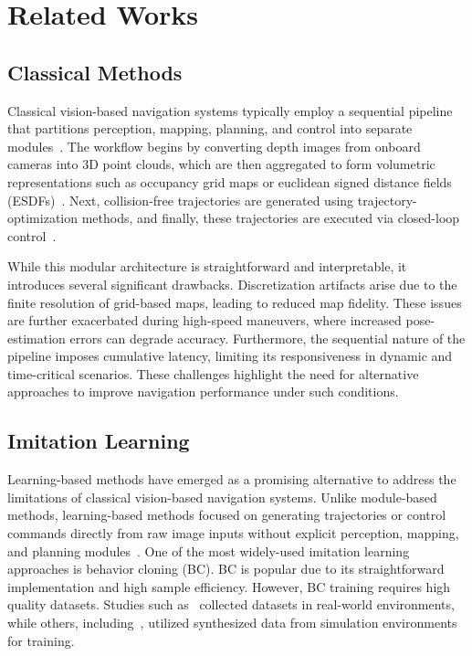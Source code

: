 \section{Related Works}
\label{Related Works}
\subsection{Classical Methods}
Classical vision-based navigation systems typically employ a sequential pipeline that partitions perception, mapping, planning, and control into separate modules~\cite{tordesillas2021faster, zhou2021raptor}. The workflow begins by converting depth images from onboard cameras into 3D point clouds, which are then aggregated to form volumetric representations such as occupancy grid maps or euclidean signed distance fields (ESDFs)~\cite{zhou2021raptor}. Next, collision-free trajectories are generated using trajectory-optimization methods, and finally, these trajectories are executed via closed-loop control~\cite{lee2010geometric, Falanga2018}. 

While this modular architecture is straightforward and interpretable, it introduces several significant drawbacks. Discretization artifacts arise due to the finite resolution of grid-based maps, leading to reduced map fidelity. These issues are further exacerbated during high-speed maneuvers, where increased pose-estimation errors can degrade accuracy. Furthermore, the sequential nature of the pipeline imposes cumulative latency, limiting its responsiveness in dynamic and time-critical scenarios. These challenges highlight the need for alternative approaches to improve navigation performance under such conditions.

\subsection{Imitation Learning}
Learning-based methods have emerged as a promising alternative to address the limitations of classical vision-based navigation systems. Unlike module-based methods, learning-based methods focused on generating trajectories or control commands directly from raw image inputs without explicit perception, mapping, and planning modules~\cite{loquercio2021learning, gandhi2017learning, loquercio2018dronet, nguyen2024uncertainty}. One of the most widely-used imitation learning approaches is behavior cloning (BC). BC is popular due to its straightforward implementation and high sample efficiency. However, BC training requires high quality datasets. Studies such as~\cite{gandhi2017learning, loquercio2018dronet} collected datasets in real-world environments, while others, including~\cite{loquercio2021learning, nguyen2024uncertainty}, utilized synthesized data from simulation environments for training.

